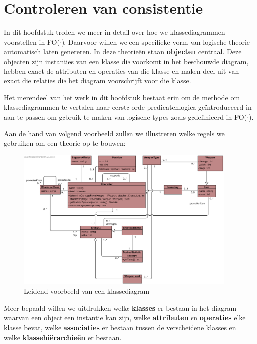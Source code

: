 \chapter{Controleren van consistentie}\label{sec:consistentie}
In dit hoofdstuk treden we meer in detail over hoe we klassediagrammen voorstellen in FO($\cdot$). Daarvoor willen we een specifieke vorm van logische theorie automatisch laten genereren. In deze theorie\"en staan \textbf{objecten} centraal. Deze objecten zijn instanties van een klasse die voorkomt in het beschouwde diagram, hebben exact de attributen en operaties van die klasse en maken deel uit van exact die relaties die het diagram voorschrijft voor die klasse.

Het merendeel van het werk in dit hoofdstuk bestaat erin om de methode om klassediagrammen te vertalen naar eerste-orde-predicatenlogica ge\"introduceerd in \cite{BerardiDaniela2005RoUc} aan te passen om gebruik te maken van logische types zoals gedefinieerd in FO($\cdot$).

Aan de hand van volgend voorbeeld zullen we illustreren welke regels we gebruiken om een theorie op te bouwen:

\begin{figure}[H]
	\includegraphics[width=0.95\textwidth]{chap-consistentie/diagram-voorbeeld.png}
	\caption{Leidend voorbeeld van een klassediagram}
	\label{fig:diagram-voorbeeld}
\end{figure}

Meer bepaald willen we uitdrukken welke \textbf{klasses} er bestaan in het diagram waarvan een object een instantie kan zijn, welke \textbf{attributen} en \textbf{operaties} elke klasse bevat, welke \textbf{associaties} er bestaan tussen de verscheidene klasses en welke \textbf{klassehi\"erarchie\"en} er bestaan.

